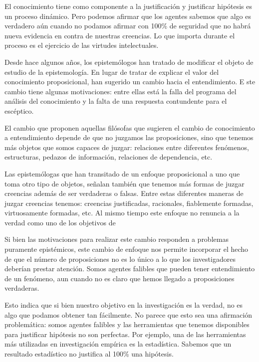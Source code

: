 {{{{{El conocimiento tiene como componente a la justificación y justificar hipótesis es un proceso dinámico.
Pero podemos afirmar que los agentes sabemos que algo es verdadero aún cuando no podamos afirmar con 100\% de seguridad que no habrá nueva evidencia en contra de nuestras creencias.
Lo que importa durante el proceso es el ejercicio de las virtudes intelectuales.

Desde hace algunos años, los epistemólogos han tratado de modificar el objeto de estudio de la epistemología.
En lugar de tratar de explicar el valor del conocimiento proposicional, han sugerido un cambio hacia el entendimiento. E
ste cambio tiene algunas motivaciones: entre ellas está la falla del programa del análisis del conocimiento y la falta de una respuesta contundente para el escéptico.

El cambio que proponen aquellas filósofas que sugieren el cambio de conocimiento a entendimiento depende de que no juzgamos las proposiciones, sino que tenemos más objetos que somos capaces de juzgar: relaciones entre diferentes fenómenos, estructuras, pedazos de información, relaciones de dependencia, etc.

Las epistemólogas que han transitado de un enfoque proposicional a uno que toma otro tipo de objetos, señalan también que tenemos más formas de juzgar creencias además de ser verdaderas o falsas.
Entre estas diferentes maneras de juzgar creencias tenemos: creencias justificadas, racionales, fiablemente formadas, virtuosamente formadas, etc.
Al mismo tiempo este enfoque no renuncia a la verdad como uno de los objetivos de %

Si bien las motivaciones para realizar este cambio responden a problemas puramente epistémicos, este cambio de enfoque nos permite incorporar el hecho de que el número de proposiciones no es lo único a lo que los investigadores deberían prestar atención.
Somos agentes falibles que pueden tener entendimiento de un fenómeno, aun cuando no es claro que hemos llegado a proposiciones verdaderas.

Esto indica que si bien nuestro objetivo en la investigación es la verdad, no es algo que podamos obtener tan fácilmente.
No parece que esto sea una afirmación problemática: somos agentes falibles y las herramientas que tenemos disponibles para justificar hipótesis no son perfectas.
Por ejemplo, una de las herramientas más utilizadas en investigación empírica es la estadística.
Sabemos que un resultado estadístico no justifica al 100\% una hipótesis.

}}}}}
